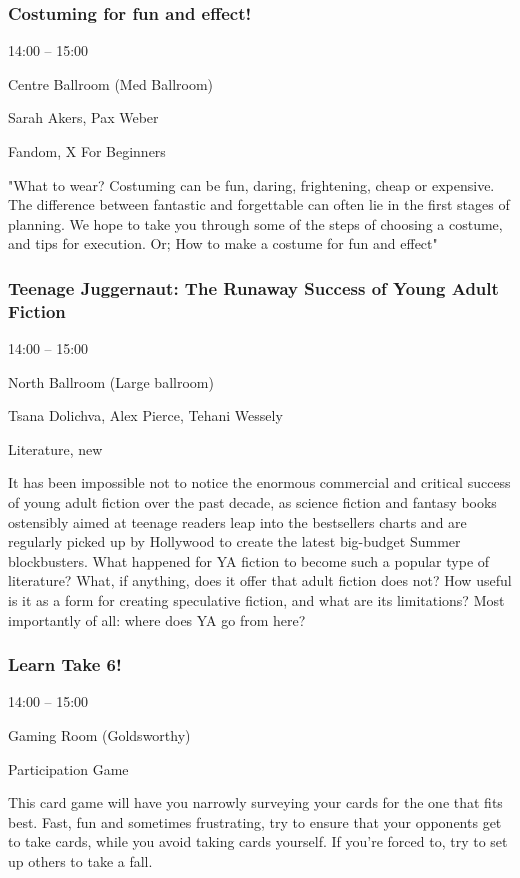 \documentclass{scrreprt}
\begin{document}
\begin{multicols}{2}
\subsubsection*{Costuming for fun and effect!}\begin{description}
\setlength{\itemsep}{0pt}
\setlength{\parsep}{0pt}
\setlength{\parskip}{0pt}
\item[Time:]{14:00 -- 15:00}
\item[Venue:]{Centre Ballroom (Med Ballroom)}
\item[People:]{Sarah Akers, Pax Weber}
\item[Tags:]{Fandom, X For Beginners}\end{description}
"What to wear? Costuming can be fun, daring, frightening, cheap or expensive. The difference between fantastic and forgettable can often lie in the first stages of planning. We hope to take you through some of the steps of choosing a costume, and tips for execution. Or; How to make a costume for fun and effect"
\subsubsection*{Teenage Juggernaut: The Runaway Success of Young Adult Fiction}\begin{description}
\setlength{\itemsep}{0pt}
\setlength{\parsep}{0pt}
\setlength{\parskip}{0pt}
\item[Time:]{14:00 -- 15:00}
\item[Venue:]{North Ballroom (Large ballroom)}
\item[People:]{Tsana Dolichva, Alex Pierce, Tehani Wessely}
\item[Tags:]{Literature, new}\end{description}
It has been impossible not to notice the enormous commercial and critical success of young adult fiction over the past decade, as science fiction and fantasy books ostensibly aimed at teenage readers leap into the bestsellers charts and are regularly picked up by Hollywood to create the latest big-budget Summer blockbusters. What happened for YA fiction to become such a popular type of literature? What, if anything, does it offer that adult fiction does not? How useful is it as a form for creating speculative fiction, and what are its limitations? Most importantly of all: where does YA go from here?
\subsubsection*{Learn Take 6!}\begin{description}
\setlength{\itemsep}{0pt}
\setlength{\parsep}{0pt}
\setlength{\parskip}{0pt}
\item[Time:]{14:00 -- 15:00}
\item[Venue:]{Gaming Room (Goldsworthy)}
\item[Tags:]{Participation Game}\end{description}
This card game will have you narrowly surveying your cards for the one that fits best. Fast, fun and sometimes frustrating, try to ensure that your opponents get to take cards, while you avoid taking cards yourself. If you're forced to, try to set up others to take a fall.

\end{multicols}
\end{document}

